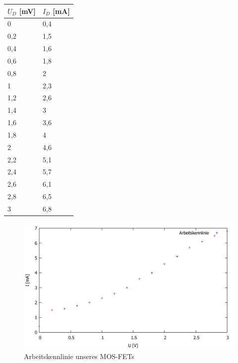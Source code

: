 \documentclass{scrartcl}
\begin{document}
\begin{table}[H]
\begin{center}
\begin{tabular}{l|l}
$U_D$ [mV]   &   $I_D$ [mA] \\
\hline
0	&0,4\\
0,2	&1,5\\
0,4	&1,6\\
0,6	&1,8\\
0,8	&2\\
1	&2,3\\
1,2	&2,6\\
1,4	&3\\
1,6	&3,6\\
1,8	&4\\
2	&4,6\\
2,2	&5,1\\
2,4	&5,7\\
2,6	&6,1\\
2,8	&6,5\\
3	&6,8\\
\end{tabular}
\end{center}
\label{tab:mosfet_UD}
\end{table}

\begin{figure}[H]
  \centering
    \includegraphics[scale=0.5]{v4_arbeit.pdf}
  \caption{Arbeitskennlinie unseres MOS-FETs}
  \label{fig:Kennlinie_S_Source}
\end{figure}
\end{document}
